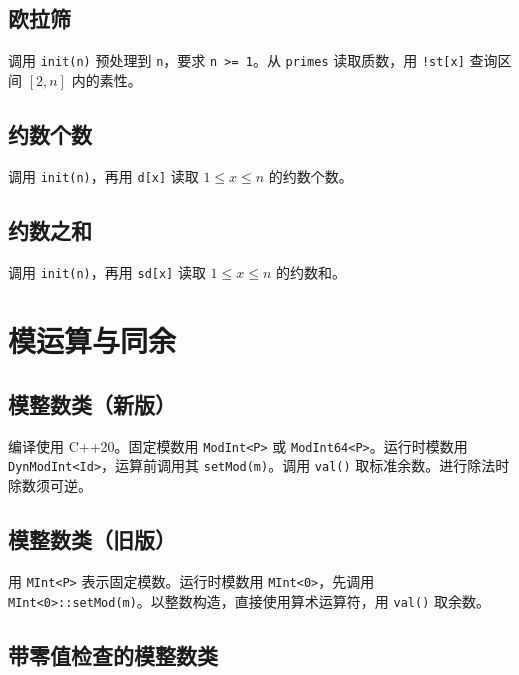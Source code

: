 \subsection{欧拉筛}

调用 \texttt{init(n)} 预处理到 \texttt{n}，要求 \texttt{n >= 1}。从 \texttt{primes} 读取质数，用 \texttt{!st[x]} 查询区间 $[2,n]$ 内的素性。


\subsection{约数个数}

调用 \texttt{init(n)}，再用 \texttt{d[x]} 读取 $1\le x\le n$ 的约数个数。


\subsection{约数之和}

调用 \texttt{init(n)}，再用 \texttt{sd[x]} 读取 $1\le x\le n$ 的约数和。


\section{模运算与同余}

\subsection{模整数类（新版）}

编译使用 C++20。固定模数用 \texttt{ModInt<P>} 或 \texttt{ModInt64<P>}。运行时模数用 \texttt{DynModInt<Id>}，运算前调用其 \texttt{setMod(m)}。调用 \texttt{val()} 取标准余数。进行除法时除数须可逆。


\subsection{模整数类（旧版）}

用 \texttt{MInt<P>} 表示固定模数。运行时模数用 \texttt{MInt<0>}，先调用 \texttt{MInt<0>::setMod(m)}。以整数构造，直接使用算术运算符，用 \texttt{val()} 取余数。


\subsection{带零值检查的模整数类}

